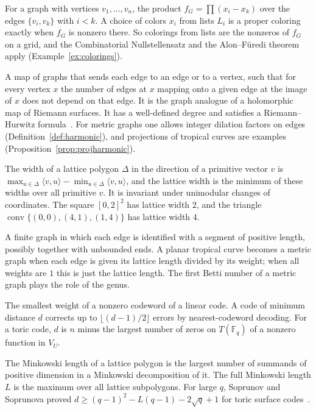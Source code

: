 \documentclass[12pt,letterpaper]{article}
\numberwithin{equation}{section}
\theoremstyle{definition}
\theoremstyle{remark}
\DeclareMathOperator{\conv}{conv}
\newcommand{\Fq}{\mathbb{F}_q}
\begin{document}
\begin{description}[leftmargin=1.5em,labelindent=0pt,style=nextline]
\item[Graph polynomial] For a graph with vertices $v_1,\dots,v_n$, the
product $f_G=\prod(x_i-x_k)$ over the edges $\{v_i,v_k\}$ with $i<k$. A choice
of colors $x_i$ from lists $L_i$ is a proper coloring exactly when $f_G$ is
nonzero there. So colorings from lists are the nonzeros of $f_G$ on a grid,
and the Combinatorial Nullstellensatz and the Alon--F\"uredi theorem apply
(Example~\ref{ex:colorings}).
\item[Harmonic morphism] A map of graphs that sends each edge to an edge or to
a vertex, such that for every vertex $x$ the number of edges at $x$ mapping
onto a given edge at the image of $x$ does not depend on that edge. It is the
graph analogue of a holomorphic map of Riemann surfaces. It has a
well-defined degree and satisfies a Riemann--Hurwitz formula~\cite{BN09}. For
metric graphs one allows integer dilation factors on edges
(Definition~\ref{def:harmonic}), and projections of tropical curves are
examples (Proposition~\ref{prop:projharmonic}).
\item[Lattice width] The width of a lattice polygon $\Delta$ in the direction
of a primitive vector $v$ is $\max_{u\in\Delta}\langle v,u\rangle-
\min_{u\in\Delta}\langle v,u\rangle$, and the lattice width is the minimum of
these widths over all primitive $v$. It is
invariant under unimodular changes of coordinates. The square $[0,2]^2$ has
lattice width $2$, and the triangle $\conv\{(0,0),(4,1),(1,4)\}$ has lattice
width $4$.
\item[Metric graph] A finite graph in which each edge is identified with a
segment of positive length, possibly together with unbounded ends. A planar
tropical curve becomes a metric graph when each edge is given its lattice
length divided by its weight; when all weights are $1$ this is just the
lattice length. The first Betti number of a metric graph plays the role of the
genus.
\item[Minimum distance] The smallest weight of a nonzero codeword of a linear
code. A code of minimum distance $d$ corrects up to $\lfloor(d-1)/2\rfloor$
errors by nearest-codeword decoding. For a toric code, $d$ is $n$ minus the
largest number of zeros on $T(\Fq)$ of a nonzero function in $V_U$.
\item[Minkowski length] The Minkowski length of a lattice polygon is the
largest number of summands of positive dimension in a Minkowski decomposition
of it. The full Minkowski length $L$ is the maximum over all lattice
subpolygons. For large $q$, Soprunov and Soprunova proved
$d\ge(q-1)^2-L(q-1)-2\sqrt q+1$ for toric surface codes~\cite{SS09}.

\end{description}
\end{document}
